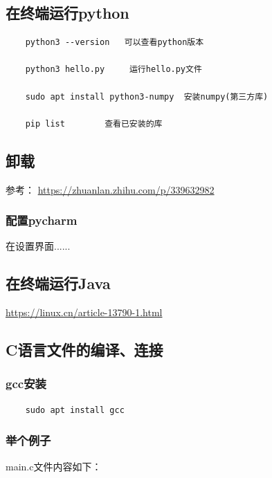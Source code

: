 \documentclass[12pt]{article}
\begin{document}
\newpage
\subsection{在终端运行python}

\begin{verbatim}
    python3 --version   可以查看python版本

    python3 hello.py     运行hello.py文件

    sudo apt install python3-numpy  安装numpy(第三方库)

    pip list        查看已安装的库
\end{verbatim}


\subsection{卸载}

参考：
\href{https://zhuanlan.zhihu.com/p/339632982}{https://zhuanlan.zhihu.com/p/339632982}

\subsubsection{配置pycharm}

在设置界面......

\subsection{在终端运行Java}

\href{https://linux.cn/article-13790-1.html}{https://linux.cn/article-13790-1.html}

\subsection{C语言文件的编译、连接}

\subsubsection{gcc安装}

\begin{verbatim}
    sudo apt install gcc
\end{verbatim}

\subsubsection{举个例子}

main.c文件内容如下：
\end{document}
